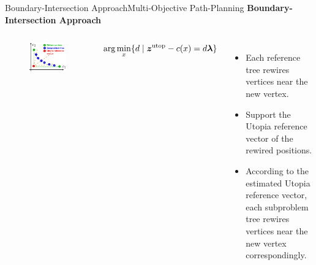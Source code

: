 \begin{frame}{Boundary-Intersection Approach}{Multi-Objective Path-Planning}
	{\bf Boundary-Intersection Approach}
	\begin{columns}
		\begin{figure}[t]
			\centering
			\includegraphics[width=\linewidth]{figure/MORRF_boundary_intersection}
		\end{figure}
		
        \begin{block}{}
		\begin{equation}
		\nonumber
		\arg\min_x \{ d \mid \bm{z}^{\rm utop} - c(x) = d \bm{\lambda} \} 
		\end{equation}
		\end{block}

		\footnotesize{
			\begin{itemize}
				\item Each reference tree rewires vertices near the new vertex.
				\item Support the Utopia reference vector of the rewired positions.
				\item According to the estimated Utopia reference vector, each subproblem tree rewires vertices near the new vertex correspondingly.
			\end{itemize}
		}
	\end{columns}
\end{frame}

